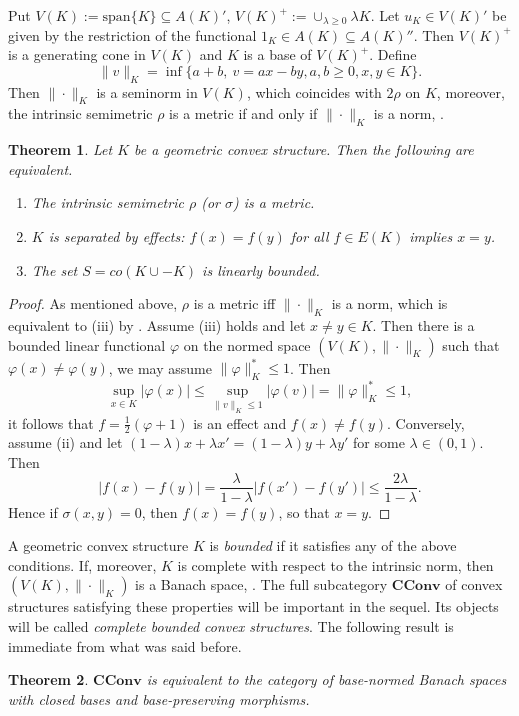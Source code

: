 \documentclass[12pt]{article}
\newtheorem{thm}{Theorem}
\newcommand{\<}{\langle}
\theoremstyle{remark}
\newcommand{\ct}[1]{\mathbf{#1}}
\begin{document}
Put  $V(K):=\mathrm{span}\{K\}\subseteq A(K)'$, $V(K)^+:=\cup_{\lambda\ge 0} \lambda K$. Let $u_K\in V(K)'$ be given by the restriction of the functional $1_K\in A(K)\subseteq A(K)''$. Then $V(K)^+$ is a generating cone in $V(K)$ and $K$ is a base of $V(K)^+$. Define
\[
\|v\|_K=\inf\{a+b,\ v=ax-by, a,b\ge 0, x,y\in K\}.
\] 
Then $\|\cdot\|_K$ is a seminorm in $V(K)$, which coincides with $2\rho$ on $K$, moreover, the intrinsic semimetric $\rho$ is a metric if and only if $\|\cdot\|_K$ is a norm, \cite{gudder}.  

\begin{thm} Let $K$ be a geometric convex structure. Then the following are equivalent.
\begin{enumerate}
\item[(i)] The intrinsic semimetric  $\rho$ (or $\sigma$) is a metric.
\item[(ii)] $K$ is separated by effects: $f(x)=f(y)$ for all $f\in E(K)$ implies $x=y$.
\item[(iii)] The set $S=co(K\cup -K)$ is linearly bounded.

\end{enumerate}




\end{thm}



\begin{proof} As mentioned above, $\rho$ is a metric iff $\|\cdot\|_K$ is a norm, which is equivalent to (iii) by \cite{ellis}. Assume (iii) holds and let $x\ne y\in K$. Then there is a bounded linear functional $\varphi$ on the normed space $(V(K),\|\cdot\|_K)$ 
such that $\varphi(x)\ne \varphi(y)$, we may assume $\|\varphi\|_K^*\le 1$. Then 
\[
\sup_{x\in K} |\varphi(x)|\le \sup_{\|v\|_K\le 1} |\varphi(v)|=\|\varphi\|_K^*\le 1,
\]
it follows that $f=\frac12(\varphi+1)$ is an effect and $f(x)\ne f(y)$. 
Conversely, assume (ii) and let $(1-\lambda)x+\lambda x'=(1-\lambda)y+\lambda y'$ for some $\lambda\in (0,1)$. Then
\[
|f(x)-f(y)|=\frac{\lambda}{1-\lambda}|f(x')-f(y')|\le \frac{2\lambda}{1-\lambda}.
\]
Hence if $\sigma(x,y)=0$, then $f(x)=f(y)$, so that  $x=y$.


\end{proof}
 
 A geometric convex structure $K$ is  \emph{bounded} if it satisfies any of  the above conditions. If, moreover,  $K$ is complete with respect to the intrinsic norm, then $(V(K),\|\cdot\|_K)$ is a Banach space, \cite{gudder}. The full subcategory $\ct{CConv}$ of 
  convex structures satisfying these properties will be important in the sequel. Its objects will be called \emph{complete bounded convex structures}. 
The following result is immediate from what was said before.

\begin{thm} 
$\ct{CConv}$ is equivalent to the category of base-normed Banach spaces with closed bases and base-preserving morphisms.
\end{thm}
\end{document}
